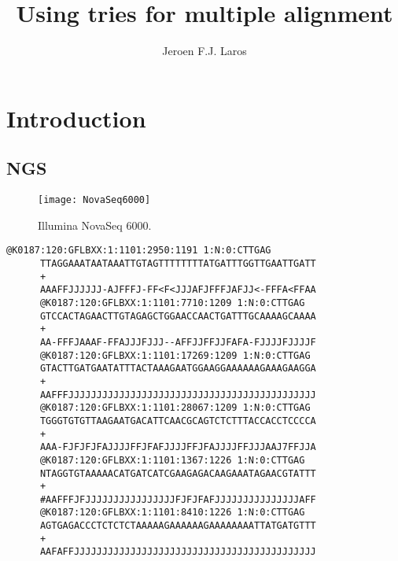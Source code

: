 \documentclass[slidestop]{beamer}
\author{Jeroen F.J. Laros}
\title{Using tries for multiple alignment}
\begin{document}



\section{Introduction}
\makeTableOfContents

\subsection{NGS}
\begin{pframe}
  \begin{minipage}[t]{0.47\textwidth}
    \begin{figure}[]
    \begin{center}
      \texttt{[image: NovaSeq6000]}
    \end{center}
    \caption{Illumina NovaSeq 6000.}
  \end{figure}
  \end{minipage}
  \hfill
  \begin{minipage}[t]{0.47\textwidth}
    \begin{Verbatim}[fontsize=\tiny]
      @K0187:120:GFLBXX:1:1101:2950:1191 1:N:0:CTTGAG
      TTAGGAAATAATAAATTGTAGTTTTTTTTATGATTTGGTTGAATTGATT
      +
      AAAFFJJJJJJ-AJFFFJ-FF<F<JJJAFJFFFJAFJJ<-FFFA<FFAA
      @K0187:120:GFLBXX:1:1101:7710:1209 1:N:0:CTTGAG
      GTCCACTAGAACTTGTAGAGCTGGAACCAACTGATTTGCAAAAGCAAAA
      +
      AA-FFFJAAAF-FFAJJJFJJJ--AFFJJFFJJFAFA-FJJJJFJJJJF
      @K0187:120:GFLBXX:1:1101:17269:1209 1:N:0:CTTGAG
      GTACTTGATGAATATTTACTAAAGAATGGAAGGAAAAAAGAAAGAAGGA
      +
      AAFFFJJJJJJJJJJJJJJJJJJJJJJJJJJJJJJJJJJJJJJJJJJJJ
      @K0187:120:GFLBXX:1:1101:28067:1209 1:N:0:CTTGAG
      TGGGTGTGTTAAGAATGACATTCAACGCAGTCTCTTTACCACCTCCCCA
      +
      AAA-FJFJFJFAJJJJFFJFAFJJJJFFJFAJJJJFFJJJAAJ7FFJJA
      @K0187:120:GFLBXX:1:1101:1367:1226 1:N:0:CTTGAG
      NTAGGTGTAAAAACATGATCATCGAAGAGACAAGAAATAGAACGTATTT
      +
      #AAFFFJFJJJJJJJJJJJJJJJJFJFJFAFJJJJJJJJJJJJJJJAFF
      @K0187:120:GFLBXX:1:1101:8410:1226 1:N:0:CTTGAG
      AGTGAGACCCTCTCTCTAAAAAGAAAAAAGAAAAAAAATTATGATGTTT
      +
      AAFAFFJJJJJJJJJJJJJJJJJJJJJJJJJJJJJJJJJJJJJJJJJJJ
    \end{Verbatim}
  \end{minipage}
\end{pframe}
\end{document}
